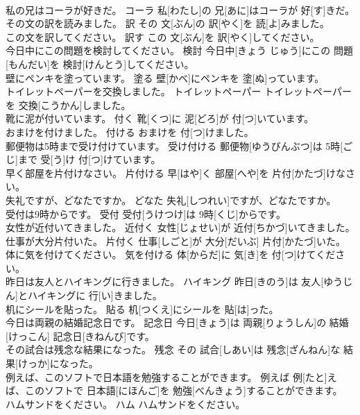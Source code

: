 \documentclass[8pt]{extreport}
\begin{document}
\begin{CJK}{UTF8}{min}
\\	私の兄はコーラが好きだ。	コーラ	私[わたし]の 兄[あに]はコーラが 好[す]きだ。	
\\	その文の訳を読みました。	訳	その 文[ぶん]の 訳[やく]を 読[よ]みました。	
\\	この文を訳してください。	訳す	この 文[ぶん]を 訳[やく]してください。	
\\	今日中にこの問題を検討してください。	検討	今日中[きょう じゅう]にこの 問題[もんだい]を 検討[けんとう]してください。	
\\	壁にペンキを塗っています。	塗る	壁[かべ]にペンキを 塗[ぬ]っています。	
\\	トイレットペーパーを交換しました。	トイレットペーパー	トイレットペーパーを 交換[こうかん]しました。	
\\	靴に泥が付いています。	付く	靴[くつ]に 泥[どろ]が 付[つ]いています。	
\\	おまけを付けました。	付ける	おまけを 付[つ]けました。	
\\	郵便物は5時まで受け付けています。	受け付ける	郵便物[ゆうびんぶつ]は 5時[ごじ]まで 受[う]け 付[つ]けています。	
\\	早く部屋を片付けなさい。	片付ける	早[はや]く 部屋[へや]を 片付[かたづ]けなさい。	
\\	失礼ですが、どなたですか。	どなた	失礼[しつれい]ですが、どなたですか。	
\\	受付は9時からです。	受付	受付[うけつけ]は 9時[くじ]からです。	
\\	女性が近付いてきました。	近付く	女性[じょせい]が 近付[ちかづ]いてきました。	
\\	仕事が大分片付いた。	片付く	仕事[しごと]が 大分[だいぶ] 片付[かたづ]いた。	
\\	体に気を付けてください。	気を付ける	体[からだ]に 気[き]を 付[つ]けてください。	
\\	昨日は友人とハイキングに行きました。	ハイキング	昨日[きのう]は 友人[ゆうじん]とハイキングに 行[い]きました。	
\\	机にシールを貼った。	貼る	机[つくえ]にシールを 貼[は]った。	
\\	今日は両親の結婚記念日です。	記念日	今日[きょう]は 両親[りょうしん]の 結婚[けっこん] 記念日[きねんび]です。	
\\	その試合は残念な結果になった。	残念	その 試合[しあい]は 残念[ざんねん]な 結果[けっか]になった。	
\\	例えば、このソフトで日本語を勉強することができます。	例えば	例[たと]えば、このソフトで 日本語[にほんご]を 勉強[べんきょう]することができます。	
\\	ハムサンドをください。	ハム	ハムサンドをください。	

\end{CJK}
\end{document}
